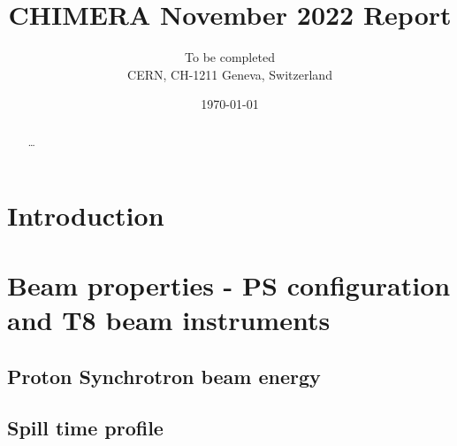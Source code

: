 \documentclass{cernatsnote}
\title{CHIMERA November 2022 Report}
\author{
    	To be completed \; \\		
    	CERN, CH-1211 Geneva, Switzerland
    }
\date{\today}
\begin{document}
    \newcommand{\figref}[1]{Fig.\,\ref{#1}}
    \newcommand{\tabref}[1]{Table\,\ref{#1}}
    \newcommand{\secref}[1]{Section\,\ref{#1}}

    \maketitle
    
    \begin{abstract}
        \ldots
    \end{abstract}

    \begingroup
    \color{black}
    \pagebreak
    \tableofcontents
    \endgroup

\pagebreak

\section{Introduction} %


\section{Beam properties - PS configuration and T8 beam instruments}

\subsection{Proton Synchrotron beam energy} %





\subsection{Spill time profile} %

\end{document}
